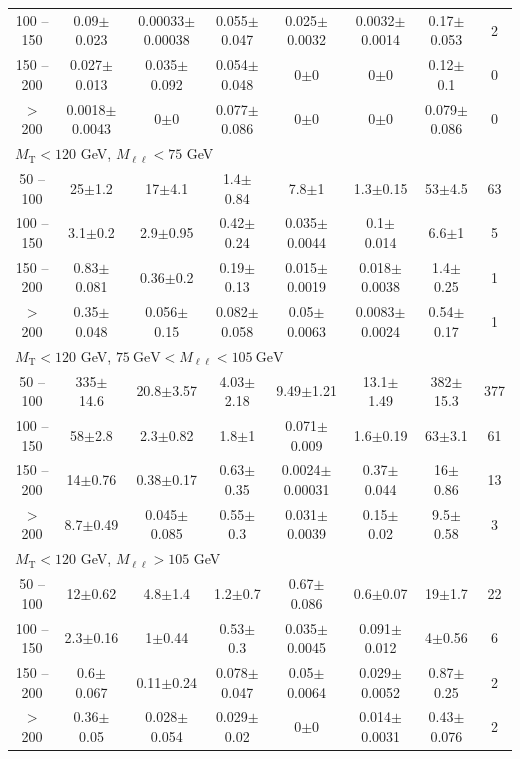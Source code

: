 \begin{landscape}
\begin{table}
\begin{center}
\begin{tabular}{| c | c c c c c c c | }
100 -- 150&0.09$\pm$0.023&0.00033$\pm$0.00038&0.055$\pm$0.047&0.025$\pm$0.0032&0.0032$\pm$0.0014&0.17$\pm$0.053&2\\
150 -- 200&0.027$\pm$0.013&0.035$\pm$0.092&0.054$\pm$0.048&0$\pm$0&0$\pm$0&0.12$\pm$0.1&0\\
$>$ 200&0.0018$\pm$0.0043&0$\pm$0&0.077$\pm$0.086&0$\pm$0&0$\pm$0&0.079$\pm$0.086&0\\
\hline\hline
\multicolumn{8}{l}{$M_{\text{T}} < 120$ GeV, $M_{\ell\ell} < 75$ GeV}\\\hline\hline
50 -- 100&25$\pm$1.2&17$\pm$4.1&1.4$\pm$0.84&7.8$\pm$1&1.3$\pm$0.15&53$\pm$4.5&63\\
100 -- 150&3.1$\pm$0.2&2.9$\pm$0.95&0.42$\pm$0.24&0.035$\pm$0.0044&0.1$\pm$0.014&6.6$\pm$1&5\\
150 -- 200&0.83$\pm$0.081&0.36$\pm$0.2&0.19$\pm$0.13&0.015$\pm$0.0019&0.018$\pm$0.0038&1.4$\pm$0.25&1\\
$>$ 200&0.35$\pm$0.048&0.056$\pm$0.15&0.082$\pm$0.058&0.05$\pm$0.0063&0.0083$\pm$0.0024&0.54$\pm$0.17&1\\
\hline\hline
\multicolumn{8}{l}{$M_{\text{T}} < 120$ GeV, $75~\mathrm{GeV} < M_{\ell\ell} < 105~\mathrm{GeV}$}\\\hline\hline
50 -- 100&335$\pm$14.6&20.8$\pm$3.57&4.03$\pm$2.18&9.49$\pm$1.21&13.1$\pm$1.49&382$\pm$15.3&377\\
100 -- 150&58$\pm$2.8&2.3$\pm$0.82&1.8$\pm$1&0.071$\pm$0.009&1.6$\pm$0.19&63$\pm$3.1&61\\
150 -- 200&14$\pm$0.76&0.38$\pm$0.17&0.63$\pm$0.35&0.0024$\pm$0.00031&0.37$\pm$0.044&16$\pm$0.86&13\\
$>$ 200&8.7$\pm$0.49&0.045$\pm$0.085&0.55$\pm$0.3&0.031$\pm$0.0039&0.15$\pm$0.02&9.5$\pm$0.58&3\\
\hline\hline
\multicolumn{8}{l}{$M_{\text{T}} < 120$ GeV, $M_{\ell\ell} > 105$ GeV}\\\hline\hline
50 -- 100&12$\pm$0.62&4.8$\pm$1.4&1.2$\pm$0.7&0.67$\pm$0.086&0.6$\pm$0.07&19$\pm$1.7&22\\
100 -- 150&2.3$\pm$0.16&1$\pm$0.44&0.53$\pm$0.3&0.035$\pm$0.0045&0.091$\pm$0.012&4$\pm$0.56&6\\
150 -- 200&0.6$\pm$0.067&0.11$\pm$0.24&0.078$\pm$0.047&0.05$\pm$0.0064&0.029$\pm$0.0052&0.87$\pm$0.25&2\\
$>$ 200&0.36$\pm$0.05&0.028$\pm$0.054&0.029$\pm$0.02&0$\pm$0&0.014$\pm$0.0031&0.43$\pm$0.076&2\\
\hline\hline
\end{tabular}
\end{center}

\end{table}
\end{landscape}
